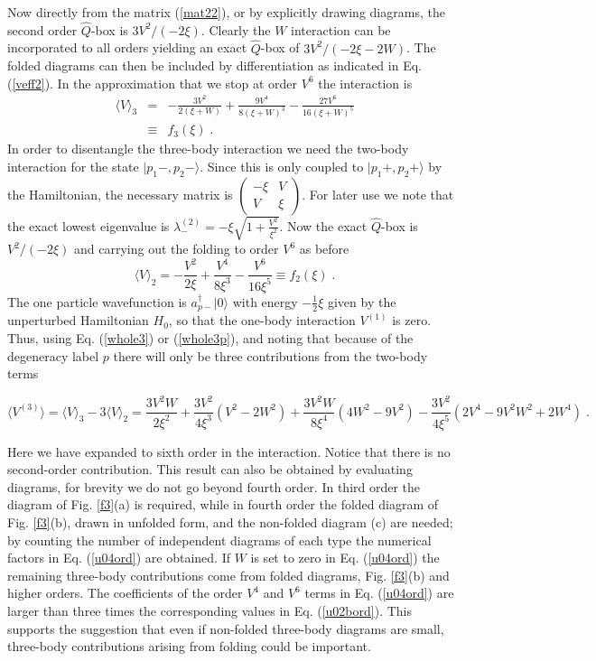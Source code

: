 \documentclass[prc,aps,amsmath,amssymb,preprintnumbers,showpacs,twocolumn]{revtex4}
\def\thalf{{\textstyle{\frac{1}{2}}}}
\begin{document}
Now directly from the matrix (\ref{mat22}), or by explicitly drawing 
diagrams, the second order $\hat{Q}$-box is $3V^2/(-2\xi)$. Clearly 
the $W$ interaction can be incorporated to all orders yielding an exact 
$\hat{Q}$-box of $3V^2/(-2\xi-2W)$. The folded diagrams can then be
included by differentiation as indicated in Eq. (\ref{veff2}). In the 
approximation that we stop at order $V^6$  the interaction is
\begin{eqnarray}
\langle V\rangle_3&=&-\frac{3V^2}{2(\xi+W)}
+\frac{9V^4}{8(\xi+W)^3}-\frac{27V^6}{16(\xi+W)^5}\nonumber\\
&\equiv& f_3(\xi)\;.
\end{eqnarray}
In order to disentangle the three-body interaction we need the two-body 
interaction for the state $|p_1-,p_2-\rangle$. Since
this is only coupled to $|p_1+,p_2+\rangle$ by the Hamiltonian, the 
necessary matrix is
$\left(\begin{array}{cc}
-\xi&V\\
V&\xi
\end{array}\right)$.  For later use we note that the exact lowest 
eigenvalue is $\lambda_-^{(2)}=-\xi\sqrt{1+\frac{V^2}{\xi^2}}$.
Now the exact $\hat{Q}$-box is $V^2/(-2\xi)$ and carrying out the
folding to order $V^6$ as before 
\begin{equation}
\langle V\rangle_2=-\frac{V^2}{2\xi}+\frac{V^4}{8\xi^3}
-\frac{V^6}{16\xi^5}
\equiv f_2(\xi)\;. \label{u02bord}
\end{equation}
The one particle wavefunction is $a^\dagger_{p-}|0\rangle$ with energy 
$-\thalf\xi$ given by the unperturbed Hamiltonian $H_0$, so that the
one-body interaction $V^{(1)}$ is zero. Thus, using Eq. (\ref{whole3}) 
or (\ref{whole3p}), and noting that because of the degeneracy label $p$ 
there will only be three contributions from the two-body terms
\begin{widetext}
\begin{equation}
\langle V^{(3)}\rangle=\langle V\rangle_3-3\langle V\rangle_2
=\frac{3V^2W}{2\xi^2}+\frac{3V^2}{4\xi^3}(V^2-2W^2)  
+\frac{3V^2W}{8\xi^4}(4W^2-9V^2)-\frac{3V^2}{4\xi^5}
(2V^4-9V^2W^2+2W^4)\;. \label{u04ord}
\end{equation}
\end{widetext}
Here we have expanded to sixth order in the interaction. Notice that there
is no second-order contribution. This result can also be obtained by
evaluating diagrams, for brevity we do not go beyond fourth order.
In third order the diagram of Fig. \ref{f3}(a) is required, while in
fourth order the folded diagram of  Fig. \ref{f3}(b), drawn in unfolded form, 
and the non-folded diagram (c) are needed; by counting the
number of independent diagrams of each type the numerical factors in 
Eq. (\ref{u04ord}) are obtained. If $W$ is set to zero in %
Eq. (\ref{u04ord}) the remaining three-body contributions come from  folded
diagrams, Fig. \ref{f3}(b) and higher orders. The coefficients of the 
order $V^4$ and $V^6$ terms in Eq. (\ref{u04ord}) are larger than three 
times the corresponding values in  Eq. (\ref{u02bord}). This supports the 
suggestion that even if non-folded three-body diagrams are small, three-body 
contributions arising from folding could be important.
\end{document}
